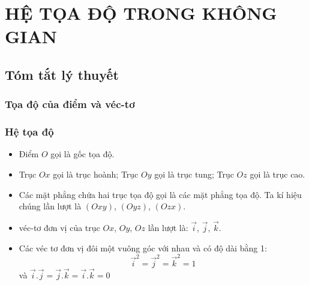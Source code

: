 \section{HỆ TỌA ĐỘ TRONG KHÔNG GIAN}
\subsection{Tóm tắt lý thuyết}
\subsubsection{Tọa độ của điểm và véc-tơ}
\subsubsection*{Hệ tọa độ}
\begin{center}
\end{center}
\begin{itemize}
	\item Điểm $O$ gọi là gốc tọa độ.
	\item Trục $Ox$ gọi là trục hoành; Trục $Oy$ gọi là trục tung; Trục $Oz$ gọi là trục cao.
	\item Các mặt phẳng chứa hai trục tọa độ gọi là các mặt phẳng tọa độ. Ta kí hiệu chúng lần lượt là $\left(Oxy\right)$, $\left(Oyz\right)$, $\left(Ozx\right)$.
	\item véc-tơ đơn vị của trục $Ox$, $Oy$, $Oz$ lần lượt là: $\vec{i}$, $\vec{j}$, $\vec{k}$.
	\item Các véc tơ đơn vị đôi một vuông góc với nhau và có độ dài bằng 1:
	$${\vec{i}}^2={\vec{j}}^2={\vec{k}}^2=1$$  và $\vec{i}.\vec{j}=\vec{j}.\vec{k}=\vec{i}.\vec{k}=0$
\end{itemize}
